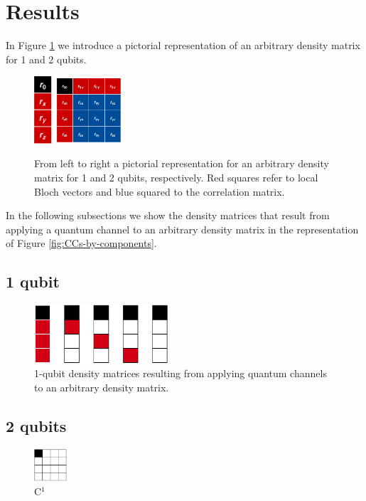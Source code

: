 \documentclass[11pt,dvipsnames]{article} %
\begin{document}
\section*{Results}
In Figure \ref{fig:pictorial-rep-rho} we introduce a pictorial representation 
of an arbitrary density matrix for 1 and 2 qubits.
\begin{figure}[H]
	\centering
	\hfill \hfill
	\includegraphics[height=2.5cm]
	{img/tablero-1q}
	\hfill
	\includegraphics[width=2.5cm]
	{img/rho2q(2)}
	\hfill \hfill
	\caption{From left to right a pictorial representation for an arbitrary
	density matrix for 1 and 2 qubits, respectively. Red squares refer to local
	Bloch vectors and blue squared to the correlation matrix.}
	\label{fig:pictorial-rep-rho}
\end{figure}
In the following subsections we show the density matrices that result from
applying a quantum channel to an arbitrary density matrix in the representation
of Figure \ref{fig:CCs-by-components}.

\subsection*{1 qubit}
\begin{figure}[H]
	\centering
	\includegraphics[width=5cm]
	{img/1q-CCs.png}
	\caption{1-qubit density matrices resulting from applying quantum channels
	to an arbitrary density matrix.}
\end{figure}

\subsection*{2 qubits}
\begin{figure}[H]
	\centering
  \includegraphics[height=1.2cm]
	{img/C16.png}
	\caption{C${}^{1}$}
\end{figure}
\end{document}
